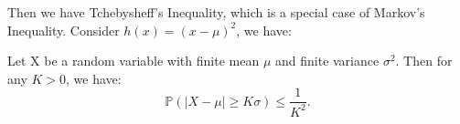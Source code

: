 \documentclass{tufte-handout}
\makeatletter
\renewcommand{\section}{\@startsection{section}%
    {3}{-1.01em}{-3ex \@plus -1ex \@minus -.2ex}%
    {1.5ex \@plus .2ex}
    {\hspace*{-5.5em}\fcolorbox{blue}{blue}{\parbox[c][1.0ex][b]{4em}{\phantom{space}}}
    \normalfont\Large\itshape\color{blue}}}
\makeatother
\begin{document}
Then we have Tchebysheff's Inequality, which is a special case of Markov's Inequality.
Consider \( h(x)= (x-\mu)^2 \), we have:

\begin{Definition}
    Let X be a random variable with finite mean \( \mu \) and finite variance \( \sigma^2 \). Then for any \( K > 0 \), we have:
    \[
        \mathbb{P}(|X - \mu| \geq K\sigma) \leq \frac{1}{K^2}.
    \]
    
\end{Definition}


\makeatletter
  \renewcommand{\section}{\@startsection{section}%
    {3}{0.8em}{-3ex \@plus -1ex \@minus -.2ex}%
    {1.5ex \@plus .2ex}
    {\hspace*{-5.5em}\fcolorbox{Periwinkle}{Periwinkle}{\parbox[c][1.0ex][b]{4em}{\phantom{space}}}
    \normalfont\Large\itshape\color{blue}}}
\makeatother



\end{document}
